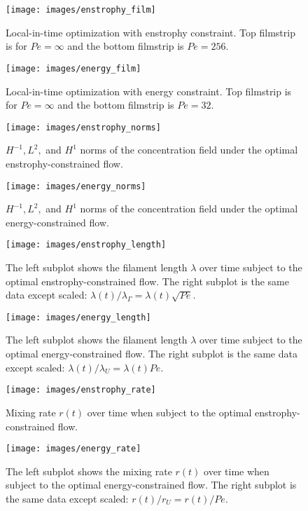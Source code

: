 \documentclass[12pt]{iopart}
\begin{document}
\begin{figure}
\texttt{[image: images/enstrophy\_film]}
\caption{Local-in-time optimization with enstrophy constraint. Top filmstrip is for $Pe =\infty$ and the bottom filmstrip is $Pe=256$.}
\label{fig:enstrophy_film}
\end{figure}
%
\begin{figure}
\texttt{[image: images/energy\_film]}
\caption{Local-in-time optimization with energy constraint. Top filmstrip is for $Pe = \infty$ and the bottom filmstrip is $Pe=32$.}
\label{fig:energy_film}
\end{figure}
%
\begin{figure}
\texttt{[image: images/enstrophy\_norms]}
\caption{$H^{-1}, L^{2},$ and $H^{1}$ norms of the concentration field under the optimal enstrophy-constrained flow.}
\label{fig:enstrophy_norms}
\end{figure}
%
\begin{figure}
\texttt{[image: images/energy\_norms]}
\caption{$H^{-1}, L^{2},$ and $H^{1}$ norms of the concentration field under the optimal energy-constrained flow.}
\label{fig:energy_norms}
\end{figure}
%
\begin{figure}
\texttt{[image: images/enstrophy\_length]}
\caption{The left subplot shows the filament length $\lambda$ over time subject to the optimal enstrophy-constrained flow. The right subplot is the same data except scaled: $\lambda(t)/\lambda_{\Gamma} = \lambda(t)\sqrt{Pe}$.}
\label{fig:enstrophy_length}
\end{figure}
%
\begin{figure}
\texttt{[image: images/energy\_length]}
\caption{The left subplot shows the filament length $\lambda$ over time subject to the optimal energy-constrained flow. The right subplot is the same data except scaled: $\lambda(t)/\lambda_{U} = \lambda(t) Pe$.}
\label{fig:energy_length}
\end{figure}
%
\begin{figure}
\centering
\texttt{[image: images/enstrophy\_rate]}
\caption{Mixing rate $r(t)$ over time when subject to the optimal enstrophy-constrained flow.}
\label{fig:enstrophy_rate}
\end{figure}
%
\begin{figure}
\centering
\texttt{[image: images/energy\_rate]}
\caption{The left subplot shows the mixing rate $r(t)$ over time when subject to the optimal energy-constrained flow. The right subplot is the same data except scaled: $r(t)/r_{U} = r(t)/Pe$.}
\label{fig:energy_rate}
\end{figure}
\end{document}
